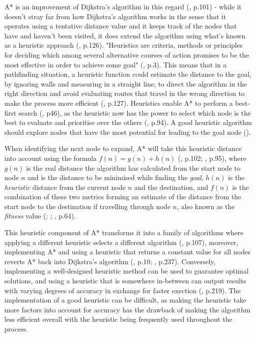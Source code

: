 \documentclass[11pt, a4paper]{article}
\begin{document}
A* is an improvement of Dijkstra's algorithm in this regard (\cite{hart1968formal}, p.101) - while it doesn't stray far from how Dijkstra's algorithm works in the sense that it operates using a tentative distance value and it keeps track of the nodes that have and haven't been visited, it does extend the algorithm using what's known as a heuristic approach (\cite{cui2011based}, p.126). "Heuristics are criteria, methods or principles for deciding which among several alternative courses of action promises to be the most effective in order to achieve some goal" (\cite{pearl1984heuristics}, p.3). This means that in a pathfinding situation, a heuristic function could estimate the distance to the goal, by ignoring walls and measuring in a straight line, to direct the algorithm in the right direction and avoid evaluating routes that travel in the wrong direction to make the process more efficient (\cite{cui2011based}, p.127). Heuristics enable A* to perform a best-first search (\cite{yap2002grid}, p46), as the heuristic now has the power to select which node is the best to evaluate and prioritise over the others (\cite{russell2016artificial}, p.94). A good heuristic algorithm should explore nodes that have the most potential for leading to the goal node (\cite{korf1985depth}).

When identifying the next node to expand, A* will take this heuristic distance into account using the formula $f(n) = g(n) + h(n)$ (\cite{hart1968formal}, p.102; \cite{russell2016artificial}, p.95), where $g(n)$ is the real distance the algorithm has calculated from the start node to node $n$ and is the distance to be minimised while finding the \emph{goal}, $h(n)$ is the \emph{heuristic} distance from the current node $n$ and the destination, and $f(n)$ is the combination of these two metrics forming an estimate of the distance from the start node to the destination if travelling through node $n$, also known as the \emph{fitness} value (\cite{hart1968formal}; \cite{millington2019ai}; \cite{graham2003pathfinding}, p.64). 

This heuristic component of A* transforms it into a family of algorithms where applying a different heuristic selects a different algorithm (\cite{hart1968formal}, p.107), moreover, implementing A* and using a heuristic that returns a constant value for all nodes reverts A* back into Dijkstra's algorithm (\cite{lester2005pathfinding}, p.10; \cite{millington2019ai}, p.237). Conversely, implementing a well-designed heuristic method can be used to guarantee optimal solutions, and using a heuristic that is somewhere in-between can output results with varying degrees of accuracy in exchange for faster exection (\cite{millington2019ai}, p.219).  The implementation of a good heuristic can be difficult, as making the heuristic take more factors into account for accuracy has the drawback of making the algorithm less efficient overall with the heuristic being frequently used throughout the process.
\end{document}
